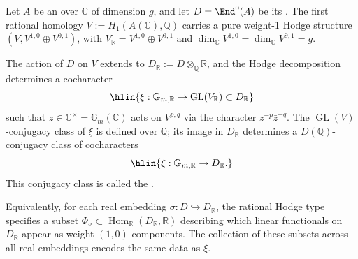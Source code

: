\begin{definition} \label{definition:rational_hodge_type_of_a_complex_abelian_variety}
    Let $A$ be an  over $\mathbb{C}$ of dimension $g$, and let $D = \End^0(A)$ be its . The first rational homology $V := H_1(A(\mathbb{C}), \mathbb{Q})$ carries a pure weight-1 Hodge structure $(V, V^{1,0} \oplus V^{0,1})$, with $V_\mathbb{R} = V^{1,0} \oplus V^{0,1}$ and $\dim_\mathbb{C} V^{1,0} = \dim_\mathbb{C} V^{0,1} = g$.

    The action of $D$ on $V$ extends to $D_\mathbb{R} := D \otimes_\mathbb{Q} \mathbb{R}$, and the Hodge decomposition determines a cocharacter
    $$\hlin{\xi: \mathbb{G}_{m,\mathbb{R}} \to \operatorname{GL}(V_\mathbb{R}) \subset D_\mathbb{R}}$$
    such that $z \in \mathbb{C}^\times = \mathbb{G}_m(\mathbb{C})$ acts on $V^{p,q}$ via the character $z^{-p}\bar{z}^{-q}$. The $\operatorname{GL}(V)$-conjugacy class of $\xi$ is defined over $\mathbb{Q}$; its image in $D_\mathbb{R}$ determines a $D(\mathbb{Q})$-conjugacy class of cocharacters
    $$\hlin{\xi: \mathbb{G}_{m,\mathbb{R}} \to D_\mathbb{R}.}$$
    This conjugacy class is called the .

    Equivalently, for each real embedding $\sigma: D \hookrightarrow D_\mathbb{R}$, the rational Hodge type specifies a subset $\Phi_\sigma \subset \operatorname{Hom}_\mathbb{R}(D_\mathbb{R}, \mathbb{R})$ describing which linear functionals on $D_\mathbb{R}$ appear as weight-$(1,0)$ components. The collection of these subsets across all real embeddings encodes the same data as $\xi$.
\end{definition}
